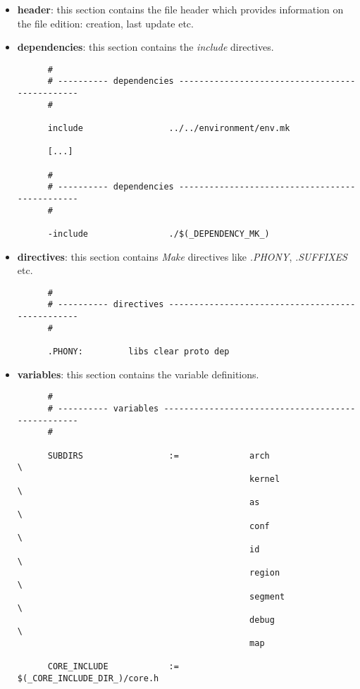 \begin{itemize}
  \item
    \textbf{header}: this section contains the file header which provides
    information on the file edition: creation, last update etc.
  \item
    \textbf{dependencies}: this section contains the \textit{include}
    directives.

    \begin{verbatim}
      #
      # ---------- dependencies -----------------------------------------------
      #

      include                 ../../environment/env.mk

      [...]

      #
      # ---------- dependencies -----------------------------------------------
      #

      -include                ./$(_DEPENDENCY_MK_)
    \end{verbatim}
  \item
    \textbf{directives}: this section contains \textit{Make} directives
    like \textit{.PHONY}, \textit{.SUFFIXES} etc.

    \begin{verbatim}
      #
      # ---------- directives -------------------------------------------------
      #

      .PHONY:         libs clear proto dep
    \end{verbatim}
  \item
    \textbf{variables}: this section contains the variable definitions.

    \begin{verbatim}
      #
      # ---------- variables --------------------------------------------------
      #

      SUBDIRS                 :=              arch                      \
                                              kernel                    \
                                              as                        \
                                              conf                      \
                                              id                        \
                                              region                    \
                                              segment                   \
                                              debug                     \
                                              map                       

      CORE_INCLUDE            :=              $(_CORE_INCLUDE_DIR_)/core.h


\end{verbatim}
\end{itemize}
